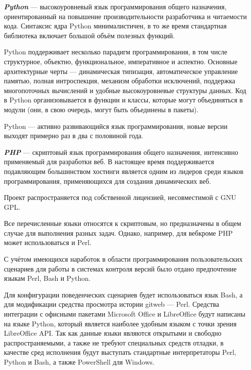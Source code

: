 \vspace{\baselineskip}
\textbf{\textit{Python}} ---  высокоуровневый язык программирования общего назначения, ориентированный на повышение производительности разработчика и читаемости кода. Синтаксис ядра Python минималистичен, в то же время стандартная библиотека включает большой объём полезных функций.

Python поддерживает несколько парадигм программирования, в том числе структурное, объектно, функциональное, императивное и аспектно. Основные архитектурные черты --- динамическая типизация, автоматическое управление памятью, полная интроспекция, механизм обработки исключений, поддержка многопоточных вычислений и удобные высокоуровневые структуры данных. Код в Python организовывается в функции и классы, которые могут объединяться в модули (они, в свою очередь, могут быть объединены в пакеты).

Python --- активно развивающийся язык программирования, новые версии выходят примерно раз в два с половиной года.

\vspace{\baselineskip}
\textbf{\textit{PHP}} ---  скриптовый язык программирования общего назначения, интенсивно применяемый для разработки веб. В настоящее время поддерживается подавляющим большинством хостинг и является одним из лидеров среди языков программирования, применяющихся для создания динамических веб.

Проект распространяется под собственной лицензией, несовместимой с GNU GPL.

\vspace{\baselineskip}
Все перечисленные языки относятся к скриптовым, но предназначены в общем случае для выполнения разных задач. Однако, например, для веб кроме PHP может использоваться и Perl.

\vspace{\baselineskip}
С учётом имеющихся наработок в области программирования пользовательских сценариев для работы в системах контроля версий было отдано предпочтение языкам Perl, Bash и Python.

\vspace{\baselineskip}
Для конфигурации поведенческих сценариев будет использоваться язык Bash, а для модификации средства просмотра истории gitweb --- Perl. Средства интеграции с офисными пакетами Microsoft Office и LibreOffice будут написаны на языке Python, который является наиболее удобным языком с точки зрения LibreOffice API. Так как данные языки являются открытыми и свободно распространяемыми, а также не требуют специальных средств отладки, в качестве сред исполнения будут выступать стандартные интерпретаторы Perl, Python и Bash, а также PowerShell для Windows.